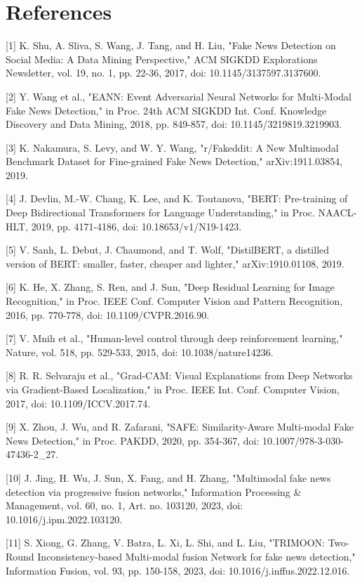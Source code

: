 \section*{References}



[1] K. Shu, A. Sliva, S. Wang, J. Tang, and H. Liu, "Fake News Detection on Social Media: A Data Mining Perspective," ACM SIGKDD Explorations Newsletter, vol. 19, no. 1, pp. 22-36, 2017, doi: 10.1145/3137597.3137600.


[2] Y. Wang et al., "EANN: Event Adversarial Neural Networks for Multi-Modal Fake News Detection," in Proc. 24th ACM SIGKDD Int. Conf. Knowledge Discovery and Data Mining, 2018, pp. 849-857, doi: 10.1145/3219819.3219903.


[3] K. Nakamura, S. Levy, and W. Y. Wang, "r/Fakeddit: A New Multimodal Benchmark Dataset for Fine-grained Fake News Detection," arXiv:1911.03854, 2019.


[4] J. Devlin, M.-W. Chang, K. Lee, and K. Toutanova, "BERT: Pre-training of Deep Bidirectional Transformers for Language Understanding," in Proc. NAACL-HLT, 2019, pp. 4171-4186, doi: 10.18653/v1/N19-1423.


[5] V. Sanh, L. Debut, J. Chaumond, and T. Wolf, "DistilBERT, a distilled version of BERT: smaller, faster, cheaper and lighter," arXiv:1910.01108, 2019.


[6] K. He, X. Zhang, S. Ren, and J. Sun, "Deep Residual Learning for Image Recognition," in Proc. IEEE Conf. Computer Vision and Pattern Recognition, 2016, pp. 770-778, doi: 10.1109/CVPR.2016.90.


[7] V. Mnih et al., "Human-level control through deep reinforcement learning," Nature, vol. 518, pp. 529-533, 2015, doi: 10.1038/nature14236.


[8] R. R. Selvaraju et al., "Grad-CAM: Visual Explanations from Deep Networks via Gradient-Based Localization," in Proc. IEEE Int. Conf. Computer Vision, 2017, doi: 10.1109/ICCV.2017.74.


[9] X. Zhou, J. Wu, and R. Zafarani, "SAFE: Similarity-Aware Multi-modal Fake News Detection," in Proc. PAKDD, 2020, pp. 354-367, doi: 10.1007/978-3-030-47436-2\_27.


[10] J. Jing, H. Wu, J. Sun, X. Fang, and H. Zhang, "Multimodal fake news detection via progressive fusion networks," Information Processing \& Management, vol. 60, no. 1, Art. no. 103120, 2023, doi: 10.1016/j.ipm.2022.103120.


[11] S. Xiong, G. Zhang, V. Batra, L. Xi, L. Shi, and L. Liu, "TRIMOON: Two-Round Inconsistency-based Multi-modal fusion Network for fake news detection," Information Fusion, vol. 93, pp. 150-158, 2023, doi: 10.1016/j.inffus.2022.12.016.


